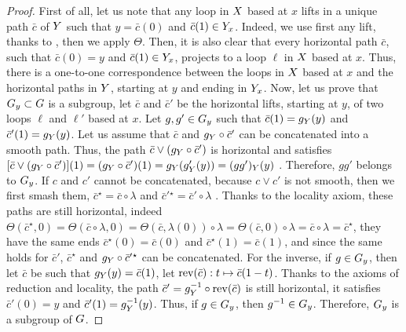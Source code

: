 \begin{proof}
  First of all,
  let us note that any loop in $X$ based at $x$ lifts in a unique path  $\bar c$ of $Y$ such that $y = \bar c(0)$ and $\bar c(1) \in Y_x$.
  Indeed, we use first any lift,
  thanks to ,
  then we apply $\Theta$.
  Then,
  it is also clear that every horizontal path $\bar c$,
  such that $\bar c(0) = y$ and $\bar c(1) \in Y_x$,
  projects to a loop $\ell$ in $X$ based at $x$.
  Thus,
  there is a one-to-one correspondence between the loops in $X$ based at $x$ and the horizontal paths in $Y$,
  starting at $y$ and ending in $Y_x$.
  Now,
  let us prove that $G_y \subset G$ is a subgroup,
  let $\bar c$ and $\bar c'$ be the horizontal lifts,
  starting at $y$,
  of two loops $\ell$ and $\ell'$ based at $x$.
  Let $g,g' \in G_y$ such that $\bar c(1) = g_Y(y)$ and $\bar c'(1) = g_Y(y)$.
  Let us assume that $\bar c$ and $g_Y \circ \bar c'$ can be concatenated into a smooth path.
  Thus,
  the path $\bar c \vee (g_Y \circ \bar c')$ is horizontal and satisfies $[\bar c \vee (g_Y \circ \bar c')](1) = (g_Y \circ \bar c')(1) = g_Y(g'_Y(y)) = (gg')_Y(y)$ .
  Therefore,
  $gg'$ belongs to $G_y$.
  If $c$ and $c'$ cannot be concatenated,
  because $c \vee c'$ is not smooth,
  then we first smash them,
  $\bar c^\star = \bar c \circ \lambda$ and ${\bar c'}{}^\star = \bar c' \circ \lambda$ .
  Thanks to the locality axiom,
  these paths are still horizontal,
  indeed $\Theta(\bar c^\star,0) = \Theta(\bar c \circ \lambda,0) = \Theta(\bar c, \lambda(0))\circ \lambda =  \Theta(\bar c,0) \circ \lambda = \bar c \circ \lambda = \bar c^\star$,
  they have the same ends $\bar c^\star(0) = \bar c(0)$ and $\bar c^\star(1) = \bar c(1)$,
  and since the same holds for $\bar c'$,
  $\bar c^\star$ and $g_Y \circ {\bar c'}{}^\star$ can be concatenated.
  For the inverse,
  if $g \in G_y$,
  then let $\bar c$ be such that $g_Y(y) = \bar c(1)$,
  let $\operatorname{rev}(\bar c) : t \mapsto \bar c(1-t)$.
  Thanks to the axioms of reduction and locality,
  the path $\bar c' = g^{-1}_Y \circ \operatorname{rev}(\bar c)$ is still horizontal,
  it satisfies $\bar c'(0) = y$ and $\bar c'(1) = g^{-1}_Y(y)$.
  Thus,
  if $g \in G_y$,
  then $g^{-1} \in G_y$.
  Therefore,
  $G_y$ is a subgroup of $G$.
  

\end{proof}
